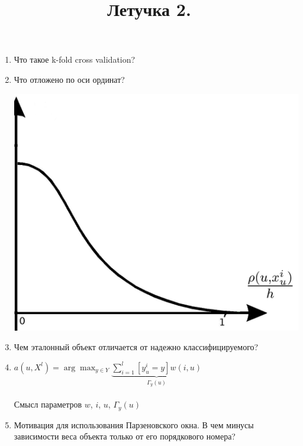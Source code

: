 \documentclass[12pt] {article}
\title{Летучка 2.}
\begin{document}
\clearpage
\thispagestyle{empty}
\begin{enumerate}
\item Что такое k-fold cross validation? 
\vspace{10mm}

\item 
\begin{minipage}[t]{0.65\linewidth}
      Что отложено по оси ординат? 
   \end{minipage}%
   \hfill
   \begin{minipage}[t]{0.35\linewidth}
     \vspace{-9.5ex}
	\includegraphics[width=.9\textwidth]{images/parzen}
   \end{minipage}

\vspace{10mm}
\item Чем эталонный объект отличается от надежно классифицируемого?   

\vspace{10mm}

\item ${a(u, X^l) = \arg\max_{y \in Y} \underbrace{\sum\limits_{i=1}^l [y_u^i = y]w(i, u)}_{\Gamma_y(u)} }$\\
\\ Смысл параметров $w$, $i$, $u$, $\Gamma_y(u)$
\vspace{10mm}
\item Мотивация для использования Парзеновского окна. В чем минусы зависимости веса объекта только от его порядкового номера?


\end{enumerate}
\end{document}

